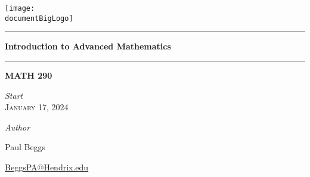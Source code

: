 \documentclass[12pt, oneside]{book}
\newcommand{\documentBigLogo}{images/logo_white_text.png}
\newcounter{BoxCounter}
\begin{document}



\newcommand{\titlestandin}[0]{Introduction to Advanced Mathematics}
\newcommand{\cussubtitle}[0]{MATH 290}
\newcommand{\startdate}[0]{January 17, 2024}
\newcommand{\customenddate}[0]{May 2, 2024}
\newcommand{\professor}[0]{Prof. Carol Ann Downes, Ph.D.}




\begin{titlepage}
    \begin{center}

        \vspace*{-2cm}
        \texttt{[image: \\documentBigLogo]}\\
        \vfill

        \textcolor{horange}{\rule{\textwidth}{1.0pt}}

        \vspace{2em}

        {\huge \textbf{\titlestandin}}

        \vspace{1em} %

        \textcolor{horange}{\rule{\textwidth}{1.0pt}}

        \vspace*{1\baselineskip}

        {\LARGE \textbf{\cussubtitle}}

        \begin{large}
            \vspace*{2\baselineskip}

            \textit{Start}  \\[1ex]
            {\scshape \startdate} \\[0.3\baselineskip] %

            \vspace*{1\baselineskip}

            \emph{Author} \\[1ex]
            {\Large Paul Beggs \\ \par} %
            {\href{mailto:BeggsPA@Hendrix.edu}{{BeggsPA@Hendrix.edu}}}\\ %


\end{large}
\end{center}
\end{titlepage}
\end{document}

